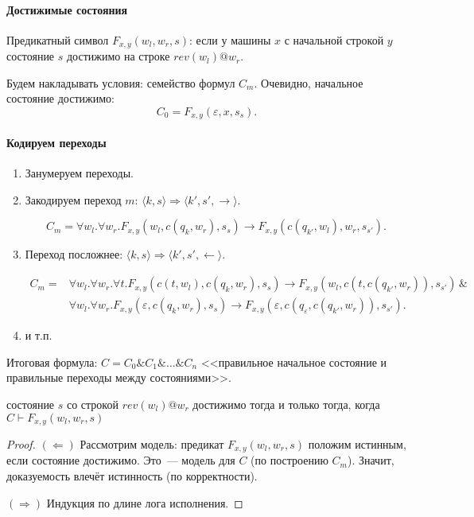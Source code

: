 \paragraph{Достижимые состояния}
Предикатный символ $F_{x,y}(w_l,w_r,s)$: если у машины $x$ с начальной строкой $y$ состояние $s$ достижимо на строке $rev(w_l) @ w_r$.

Будем накладывать условия: семейство формул $C_m$.
Очевидно, начальное состояние достижимо:
\[ C_0 = F_{x,y}(\varepsilon,x,s_s). \]


\paragraph{Кодируем переходы}
\begin{enumerate}
    \item Занумеруем переходы.
    \item Закодируем переход $m$: $\langle k, s \rangle \Rightarrow \langle k', s', \rightarrow \rangle$.

    \[ C_m = \forall w_l.\forall w_r.F_{x,y}(w_l,c(q_k,w_r),s_s) \rightarrow F_{x,y}(c(q_{k'},w_l),w_r,s_{s'}). \]
    \item Переход посложнее:
$ \langle k, s \rangle \Rightarrow \langle k', s', \leftarrow \rangle. $

\begin{align*}
    C_m = &\forall w_l.\forall w_r.\forall t.F_{x,y}(c(t,w_l),c(q_k,w_r),s_s) \rightarrow F_{x,y}(w_l,c(t,c(q_{k'},w_r)),s_{s'})\, \& \\
    &\forall w_l.\forall w_r.F_{x,y}(\varepsilon,c(q_k,w_r),s_s)
\rightarrow F_{x,y}(\varepsilon,c(q_\varepsilon,c(q_{k'},w_r)),s_{s'}). \end{align*}

    \item и т.п.
\end{enumerate}

Итоговая формула: $C = C_0 \& C_1 \& \dots \& C_n$
<<правильное начальное состояние и правильные переходы между состояниями>>.

\begin{theorem}
состояние $s$ со строкой $rev(w_l)@w_r$ достижимо тогда и только тогда, когда
$C \vdash F_{x,y}(w_l,w_r,s)$
\end{theorem}
\begin{proof}
$(\Leftarrow)$ Рассмотрим модель: предикат $F_{x,y}(w_l,w_r,s)$ положим истинным, если состояние достижимо.
Это~--- модель для $C$ (по построению $C_m$).
Значит, доказуемость влечёт истинность (по корректности).

$(\Rightarrow)$ Индукция по длине лога исполнения.
\end{proof}


